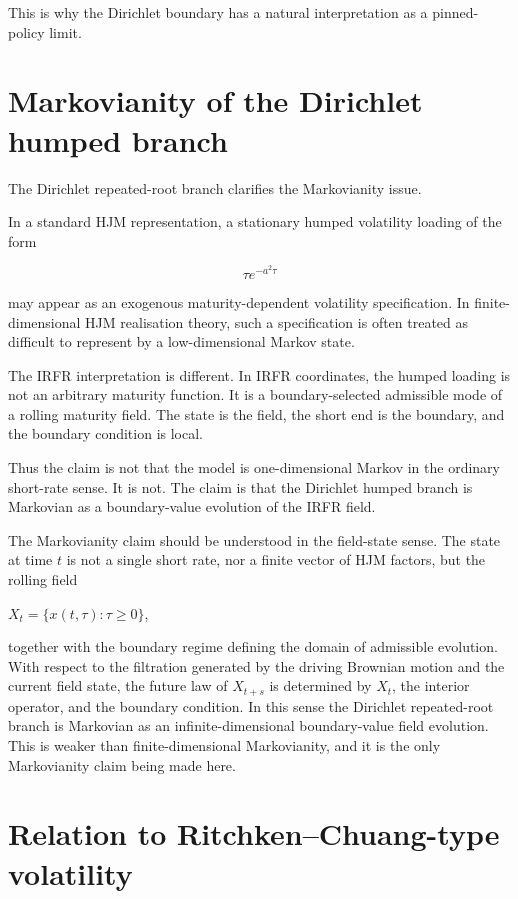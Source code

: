 \documentclass[11pt,oneside]{book}
\begin{document}
This is why the Dirichlet boundary has a natural interpretation as a
pinned-policy limit.

\section{Markovianity of the Dirichlet humped
branch}\label{markovianity-of-the-dirichlet-humped-branch}

The Dirichlet repeated-root branch clarifies the Markovianity issue.

In a standard HJM representation, a stationary humped volatility loading
of the form

\[
\tau e^{-a^2\tau}
\]

may appear as an exogenous maturity-dependent volatility specification.
In finite-dimensional HJM realisation theory, such a specification is
often treated as difficult to represent by a low-dimensional Markov
state.

The IRFR interpretation is different. In IRFR coordinates, the humped
loading is not an arbitrary maturity function. It is a boundary-selected
admissible mode of a rolling maturity field. The state is the field, the
short end is the boundary, and the boundary condition is local.

Thus the claim is not that the model is one-dimensional Markov in the
ordinary short-rate sense. It is not. The claim is that the Dirichlet
humped branch is Markovian as a boundary-value evolution of the IRFR
field.

The Markovianity claim should be understood in the field-state sense.
The state at time \(t\) is not a single short rate, nor a finite vector of
HJM factors, but the rolling field

$X_t=\{x(t,\tau):\tau\geq0\}$,

together with the boundary regime defining the domain of admissible
evolution. With respect to the filtration generated by the driving
Brownian motion and the current field state, the future law of
$X_{t+s}$ is determined by $X_t$, the interior operator, and the
boundary condition. In this sense the Dirichlet repeated-root branch is
Markovian as an infinite-dimensional boundary-value field evolution.
This is weaker than finite-dimensional Markovianity, and it is the only
Markovianity claim being made here.

\section{Relation to Ritchken--Chuang-type
volatility}\label{relation-to-ritchken-chuang-type-volatility}
\end{document}
